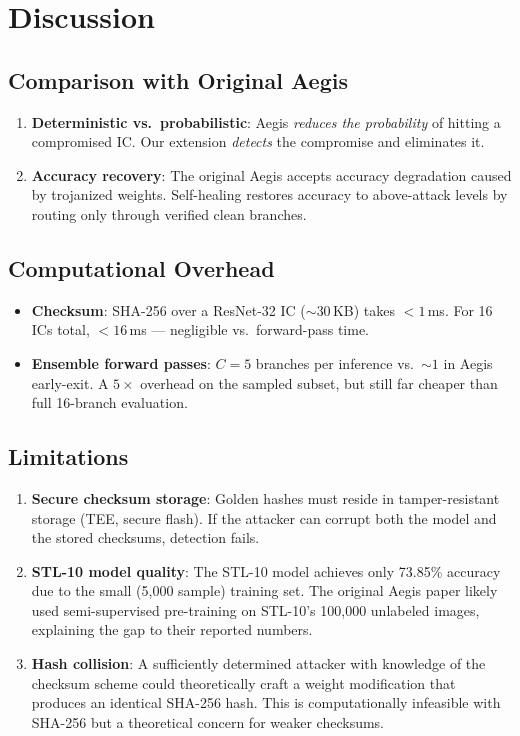 \documentclass[12pt,a4paper]{article}
\newcommand{\ic}{\textsc{IC}}
\begin{document}
\section{Discussion}
\label{sec:discussion}

\subsection{Comparison with Original Aegis}

\begin{enumerate}
    \item \textbf{Deterministic vs.\ probabilistic}: Aegis \emph{reduces the probability} of hitting a compromised \ic{}. Our extension \emph{detects} the compromise and eliminates it.
    \item \textbf{Accuracy recovery}: The original Aegis accepts accuracy degradation caused by trojanized weights. Self-healing restores accuracy to above-attack levels by routing only through verified clean branches.
\end{enumerate}

\subsection{Computational Overhead}

\begin{itemize}
    \item \textbf{Checksum}: SHA-256 over a ResNet-32 \ic{} (${\sim}30$\,KB) takes $<1$\,ms. For 16 ICs total, $<16$\,ms --- negligible vs.\ forward-pass time.
    \item \textbf{Ensemble forward passes}: $C=5$ branches per inference vs.\ $\sim1$ in Aegis early-exit. A $5\times$ overhead on the sampled subset, but still far cheaper than full 16-branch evaluation.
\end{itemize}

\subsection{Limitations}

\begin{enumerate}
    \item \textbf{Secure checksum storage}: Golden hashes must reside in tamper-resistant storage (TEE, secure flash). If the attacker can corrupt both the model and the stored checksums, detection fails.
    \item \textbf{STL-10 model quality}: The STL-10 model achieves only 73.85\% accuracy due to the small (5{,}000 sample) training set. The original Aegis paper likely used semi-supervised pre-training on STL-10's 100{,}000 unlabeled images, explaining the gap to their reported numbers.
    \item \textbf{Hash collision}: A sufficiently determined attacker with knowledge of the checksum scheme could theoretically craft a weight modification that produces an identical SHA-256 hash. This is computationally infeasible with SHA-256 but a theoretical concern for weaker checksums.
\end{enumerate}
\end{document}

